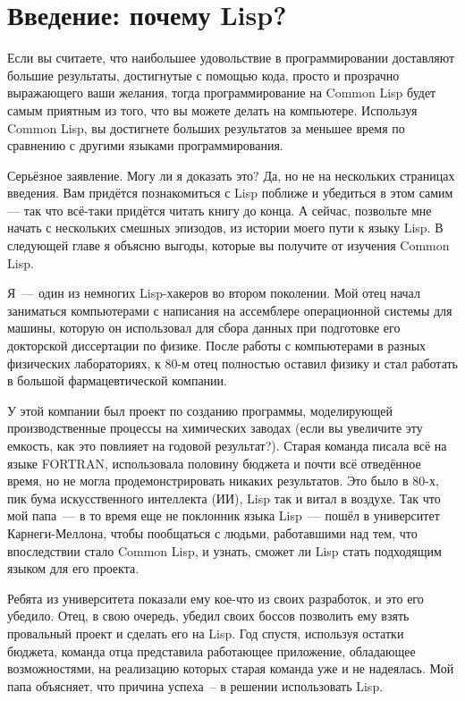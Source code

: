 \chapter{Введение: почему Lisp?}
\label{ch:01}

Если вы считаете, что наибольшее удовольствие в программировании доставляют большие
результаты, достигнутые с помощью кода, просто и прозрачно выражающего ваши желания, тогда
программирование на Common Lisp будет самым приятным из того, что вы можете делать на
компьютере. Используя Common Lisp, вы достигнете больших результатов за меньшее время по
сравнению с другими языками программирования.

Серьёзное заявление. Могу ли я доказать это? Да, но не на нескольких страницах
введения. Вам придётся познакомиться с Lisp поближе и убедиться в этом самим — так что
всё-таки придётся читать книгу до конца. А сейчас, позвольте мне начать с нескольких
смешных эпизодов, из истории моего пути к языку Lisp. В следующей главе я объясню выгоды,
которые вы получите от изучения Common Lisp.

Я~--- один из немногих Lisp-хакеров во втором поколении. Мой отец начал заниматься
компьютерами с написания на ассемблере операционной системы для машины, которую он
использовал для сбора данных при подготовке его докторской диссертации по физике. После
работы с компьютерами в разных физических лабораториях, к 80-м отец полностью оставил
физику и стал работать в большой фармацевтической компании.

У этой компании был проект по созданию программы, моделирующей производственные процессы
на химических заводах (если вы увеличите эту емкость, как это повлияет на годовой
результат?). Старая команда писала всё на языке FORTRAN, использовала половину бюджета и
почти всё отведённое время, но не могла продемонстрировать никаких результатов. Это было в
80-х, пик бума искусственного интеллекта (ИИ), Lisp так и витал в воздухе. Так что мой
папа~--- в то время еще не поклонник языка Lisp~--- пошёл в университет Карнеги-Меллона,
чтобы пообщаться с людьми, работавшими над тем, что впоследствии стало Common Lisp, и
узнать, сможет ли Lisp стать подходящим языком для его проекта.

Ребята из университета показали ему кое-что из своих разработок, и это его убедило. Отец,
в свою очередь, убедил своих боссов позволить ему взять провальный проект и сделать его на
Lisp. Год спустя, используя остатки бюджета, команда отца представила работающее
приложение, обладающее возможностями, на реализацию которых старая команда уже и не
надеялась. Мой папа объясняет, что причина успеха~-- в решении использовать Lisp.

